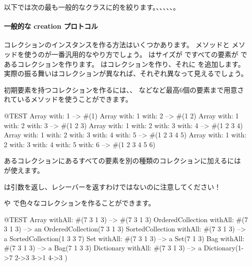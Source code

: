\documentclass[a4paper,10pt,twoside]{book}
\begin{document}
以下では次の最も一般的なクラスに的を絞ります。、、、、、。

\paragraph{一般的な creation プロトコル}
コレクションのインスタンスを作る方法はいくつかあります。 メソッドと  メソッドを使うのが一番汎用的なやり方でしょう。 はサイズが  ですべての要素が  であるコレクションを作ります。  はコレクションを作り、それに  を追加します。実際の振る舞いはコレクションが異なれば、それぞれ異なって見えるでしょう。

初期要素を持つコレクションを作るには、、 などなど最高6個の要素まで用意されているメソッドを使うことができます。

\begin{code}{@TEST}
Array with: 1 --> #(1)
Array with: 1 with: 2 --> #(1 2)
Array with: 1 with: 2 with: 3 --> #(1 2 3)
Array with: 1 with: 2 with: 3 with: 4 --> #(1 2 3 4)
Array with: 1 with: 2 with: 3 with: 4 with: 5 --> #(1 2 3 4 5)
Array with: 1 with: 2 with: 3 with: 4 with: 5 with: 6 --> #(1 2 3 4 5 6)
\end{code}

あるコレクションにあるすべての要素を別の種類のコレクションに加えるには  が使えます。

\noindent
{} は引数を返し、レシーバーを返すわけではないのに注意してください！

 や  で色々なコレクションを作ることができます。

\begin{code}{@TEST}
Array withAll: #(7 3 1 3)                      --> #(7 3 1 3)
OrderedCollection withAll: #(7 3 1 3) --> an OrderedCollection(7 3 1 3)
SortedCollection withAll: #(7 3 1 3)    --> a SortedCollection(1 3 3 7)
Set withAll: #(7 3 1 3)                         --> a Set(7 1 3)
Bag withAll: #(7 3 1 3)                        --> a Bag(7 1 3 3)
Dictionary withAll: #(7 3 1 3)               --> a Dictionary(1->7 2->3 3->1 4->3 )
\end{code}
\end{document}
